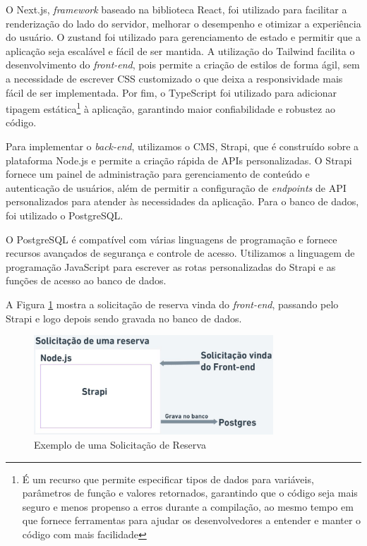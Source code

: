 \documentclass[12pt]{article}
\begin{document}
O Next.js, \textit{framework} baseado na biblioteca React, foi utilizado para facilitar a renderização do lado do servidor, melhorar o desempenho e otimizar a experiência do usuário. O zustand foi utilizado para gerenciamento de estado e permitir que a aplicação seja escalável e fácil de ser mantida. A utilização do Tailwind facilita o desenvolvimento do \textit{front-end}, pois permite a criação de estilos de forma ágil, sem a necessidade de escrever CSS customizado o que deixa a responsividade mais fácil de ser implementada. Por fim, o TypeScript foi utilizado para adicionar tipagem estática\footnote{É um recurso que permite especificar tipos de dados para variáveis, parâmetros de função e valores retornados, garantindo que o código seja mais seguro e menos propenso a erros durante a compilação, ao mesmo tempo em que fornece ferramentas para ajudar os desenvolvedores a entender e manter o código com mais facilidade} à aplicação, garantindo maior confiabilidade e robustez ao código.

Para implementar o \textit{back-end}, utilizamos o CMS, Strapi, que é construído sobre a plataforma Node.js e permite a criação rápida de APIs personalizadas. O Strapi fornece um painel de administração para gerenciamento de conteúdo e autenticação de usuários, além de permitir a configuração de \textit{endpoints} de API personalizados para atender às necessidades da aplicação. Para o banco de dados, foi utilizado o PostgreSQL. 

O PostgreSQL é compatível com várias linguagens de programação e fornece recursos avançados de segurança e controle de acesso. Utilizamos a linguagem de programação JavaScript para escrever as rotas personalizadas do Strapi e as funções de acesso ao banco de dados.

A Figura \ref{fig:exemplo_solicitacao} mostra a solicitação de reserva vinda do \textit{front-end}, passando pelo Strapi e logo depois sendo gravada no banco de dados.

\begin{figure}[ht]
\centering
\includegraphics[width=0.8\textwidth]{exemplo_solicitacao.jpg}
\caption{Exemplo de uma Solicitação de Reserva}
\label{fig:exemplo_solicitacao}
\end{figure}
\end{document}
